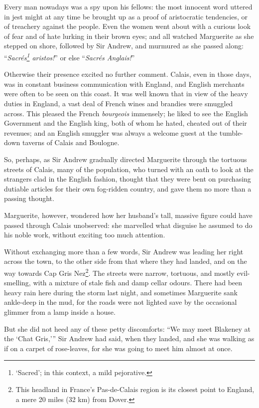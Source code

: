 Every man nowadays was a spy upon his fellows: the most innocent word uttered in jest might at any time be brought up as a proof of aristocratic tendencies, or of treachery against the people. Even the women went about with a curious look of fear and of hate lurking in their brown eyes; and all watched Marguerite as she stepped on shore, followed by Sir Andrew, and murmured as she passed along: \enquote{\textit{Sacrés\footnote{\enquote{Sacred}; in this context, a mild pejorative.} aristos!}} or else \enquote{\textit{Sacrés Anglais!}}

Otherwise their presence excited no further comment. Calais, even in those days, was in constant business communication with England, and English merchants were often to be seen on this coast. It was well known that in view of the heavy duties in England, a vast deal of French wines and brandies were smuggled across. This pleased the French \textit{bourgeois} immensely; he liked to see the English Government and the English king, both of whom he hated, cheated out of their revenues; and an English smuggler was always a welcome guest at the tumble-down taverns of Calais and Boulogne.

So, perhaps, as Sir Andrew gradually directed Marguerite through the tortuous streets of Calais, many of the population, who turned with an oath to look at the strangers clad in the English fashion, thought that they were bent on purchasing dutiable articles for their own fog-ridden country, and gave them no more than a passing thought.

Marguerite, however, wondered how her husband's tall, massive figure could have passed through Calais unobserved: she marvelled what disguise he assumed to do his noble work, without exciting too much attention.

Without exchanging more than a few words, Sir Andrew was leading her right across the town, to the other side from that where they had landed, and on the way towards Cap Gris Nez\footnote{This headland in France's Pas-de-Calais region is its closest point to England, a mere 20 miles (32 km) from Dover.}. The streets were narrow, tortuous, and mostly evil-smelling, with a mixture of stale fish and damp cellar odours. There had been heavy rain here during the storm last night, and sometimes Marguerite sank ankle-deep in the mud, for the roads were not lighted save by the occasional glimmer from a lamp inside a house.

But she did not heed any of these petty discomforts: \enquote{We may meet Blakeney at the \enquote{Chat Gris,}} Sir Andrew had said, when they landed, and she was walking as if on a carpet of rose-leaves, for she was going to meet him almost at once.

